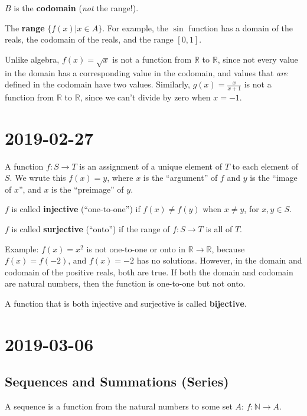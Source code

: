 \documentclass{article}
\theoremstyle{definition}
\begin{document}
$B$ is the \textbf{codomain} (\textit{not} the range!).

The \textbf{range} $\{f(x) | x \in A\}$. For example, the $\sin$ function
has a domain of the reals, the codomain of the reals, and the range $[0,1]$.

Unlike algebra, $f(x)=\sqrt{x}$ is not a function from $\mathbb{R}$ to
$\mathbb{R}$, since not every value in the domain has a corresponding value
in the codomain, and values that \textit{are} defined in the codomain have
two values. Similarly, $g(x) = \frac{x}{x+1}$ is not a function from
$\mathbb{R}$ to $\mathbb{R}$, since we can't divide by zero when $x=-1$.


\section{2019-02-27}

A function $f: S \to T$ is an assignment of a unique element of $T$ to each
element of $S$. We wrute this $f(x)=y$, where $x$ is the ``argument'' of $f$
and $y$ is the ``image of $x$'', and $x$ is the ``preimage'' of $y$.

$f$ is called \textbf{injective} (``one-to-one'') if $f(x) \neq f(y)$ when
$x \neq y$, for $x,y \in S$. 

$f$ is called \textbf{surjective} (``onto'') if the range of $f: S \to T$ is
all of $T$. 

Example: $f(x)=x^2$ is not one-to-one or onto in $\mathbb{R} \to \mathbb{R}$,
because $f(x)=f(-2)$, and $f(x)=-2$ has no solutions. However, in the domain
and codomain of the positive reals, both are true. If both the domain and 
codomain are natural numbers, then the function is one-to-one but not onto.

A function that is both injective and surjective is called \textbf{bijective}.



\section*{2019-03-06}

\subsection*{Sequences and Summations (Series)}

A sequence is a function from the natural numbers to some set $A$: $f: \mathbb{N} \to A$.
\end{document}
